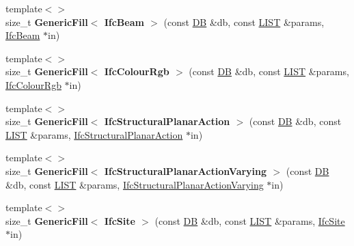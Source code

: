 \begin{DoxyCompactItemize}
\item 
\hypertarget{namespace_assimp_1_1_s_t_e_p_adca13ab1de018a11c852619792bf482b}{{\footnotesize template$<$$>$ }\\size\+\_\+t {\bfseries Generic\+Fill$<$ Ifc\+Beam $>$} (const \hyperlink{class_assimp_1_1_s_t_e_p_1_1_d_b}{D\+B} \&db, const \hyperlink{class_assimp_1_1_s_t_e_p_1_1_e_x_p_r_e_s_s_1_1_l_i_s_t}{L\+I\+S\+T} \&params, \hyperlink{struct_assimp_1_1_i_f_c_1_1_ifc_beam}{Ifc\+Beam} $\ast$in)}\label{namespace_assimp_1_1_s_t_e_p_adca13ab1de018a11c852619792bf482b}

\item 
\hypertarget{namespace_assimp_1_1_s_t_e_p_ab707f54add1d306e710c365bd829c965}{{\footnotesize template$<$$>$ }\\size\+\_\+t {\bfseries Generic\+Fill$<$ Ifc\+Colour\+Rgb $>$} (const \hyperlink{class_assimp_1_1_s_t_e_p_1_1_d_b}{D\+B} \&db, const \hyperlink{class_assimp_1_1_s_t_e_p_1_1_e_x_p_r_e_s_s_1_1_l_i_s_t}{L\+I\+S\+T} \&params, \hyperlink{struct_assimp_1_1_i_f_c_1_1_ifc_colour_rgb}{Ifc\+Colour\+Rgb} $\ast$in)}\label{namespace_assimp_1_1_s_t_e_p_ab707f54add1d306e710c365bd829c965}

\item 
\hypertarget{namespace_assimp_1_1_s_t_e_p_a91e6ff64575fa9726938c1e3e6c6b5f4}{{\footnotesize template$<$$>$ }\\size\+\_\+t {\bfseries Generic\+Fill$<$ Ifc\+Structural\+Planar\+Action $>$} (const \hyperlink{class_assimp_1_1_s_t_e_p_1_1_d_b}{D\+B} \&db, const \hyperlink{class_assimp_1_1_s_t_e_p_1_1_e_x_p_r_e_s_s_1_1_l_i_s_t}{L\+I\+S\+T} \&params, \hyperlink{struct_assimp_1_1_i_f_c_1_1_ifc_structural_planar_action}{Ifc\+Structural\+Planar\+Action} $\ast$in)}\label{namespace_assimp_1_1_s_t_e_p_a91e6ff64575fa9726938c1e3e6c6b5f4}

\item 
\hypertarget{namespace_assimp_1_1_s_t_e_p_a0f14501ae9f27eb77e38ad4fa5e5d623}{{\footnotesize template$<$$>$ }\\size\+\_\+t {\bfseries Generic\+Fill$<$ Ifc\+Structural\+Planar\+Action\+Varying $>$} (const \hyperlink{class_assimp_1_1_s_t_e_p_1_1_d_b}{D\+B} \&db, const \hyperlink{class_assimp_1_1_s_t_e_p_1_1_e_x_p_r_e_s_s_1_1_l_i_s_t}{L\+I\+S\+T} \&params, \hyperlink{struct_assimp_1_1_i_f_c_1_1_ifc_structural_planar_action_varying}{Ifc\+Structural\+Planar\+Action\+Varying} $\ast$in)}\label{namespace_assimp_1_1_s_t_e_p_a0f14501ae9f27eb77e38ad4fa5e5d623}

\item 
\hypertarget{namespace_assimp_1_1_s_t_e_p_a13bd0d9b44ddc0d6198d2104b4e171c2}{{\footnotesize template$<$$>$ }\\size\+\_\+t {\bfseries Generic\+Fill$<$ Ifc\+Site $>$} (const \hyperlink{class_assimp_1_1_s_t_e_p_1_1_d_b}{D\+B} \&db, const \hyperlink{class_assimp_1_1_s_t_e_p_1_1_e_x_p_r_e_s_s_1_1_l_i_s_t}{L\+I\+S\+T} \&params, \hyperlink{struct_assimp_1_1_i_f_c_1_1_ifc_site}{Ifc\+Site} $\ast$in)}\label{namespace_assimp_1_1_s_t_e_p_a13bd0d9b44ddc0d6198d2104b4e171c2}


\end{DoxyCompactItemize}
